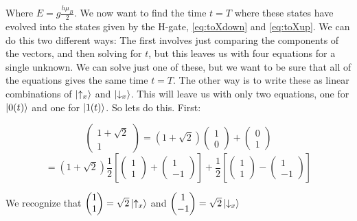 \documentclass[a4paper,norsk, 10pt]{article}
\begin{document}
Where $E = g\frac{h\mu_B}{2}$. We now want to find the time $t = T$ where these states have evolved into the states given by the H-gate, \eqref{eq:toXdown} and \eqref{eq:toXup}. We can do this two different ways: The first involves just comparing the components of the vectors, and then solving for $t$, but this leaves us with four equations for a single unknown. We can solve just one of these, but we want to be sure that all of the equations gives the same time $t = T$. The other way is to write these as linear combinations of $\ket{\uparrow _x}$ and $\ket{\downarrow _x}$. This will leave us with only two equations, one for $\ket{0(t)}$ and one for $\ket{1(t)}$. So lets do this. First:

\begin{equation}
\begin{pmatrix}
1 + \sqrt{2} \\ 1
\end{pmatrix}
= (1+\sqrt{2})
\begin{pmatrix}
1\\0
\end{pmatrix}
+
\begin{pmatrix}
0\\1
\end{pmatrix}
\end{equation}
\begin{equation}
=(1+\sqrt{2})
\frac{1}{2}\left[
\begin{pmatrix}
1\\1
\end{pmatrix}
+\begin{pmatrix}
1\\-1
\end{pmatrix}
\right]
+
\frac{1}{2}
\left[
\begin{pmatrix}
1\\1
\end{pmatrix}
-\begin{pmatrix}
1\\-1
\end{pmatrix}
\right]
\end{equation}


We recognize that $\begin{pmatrix} 1\\1 \end{pmatrix} = \sqrt{2}\ket{\uparrow_x}$ and $\begin{pmatrix} 1\\-1 \end{pmatrix} = \sqrt{2}\ket{\downarrow_x}$
\end{document}
